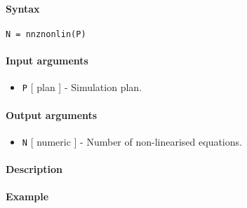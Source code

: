 


	\paragraph{Syntax}\label{syntax}

\begin{verbatim}
N = nnznonlin(P)
\end{verbatim}

\paragraph{Input arguments}\label{input-arguments}

\begin{itemize}
\itemsep1pt\parskip0pt
\item
  \texttt{P} {[} plan {]} - Simulation plan.
\end{itemize}

\paragraph{Output arguments}\label{output-arguments}

\begin{itemize}
\itemsep1pt\parskip0pt
\item
  \texttt{N} {[} numeric {]} - Number of non-linearised equations.
\end{itemize}

\paragraph{Description}\label{description}

\paragraph{Example}\label{example}


